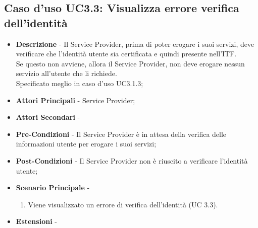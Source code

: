 \subsection{Caso d'uso UC3.3: Visualizza errore verifica dell'identità}
\begin{itemize}
	\item \textbf{Descrizione} - Il Service Provider, prima di poter erogare i suoi servizi, deve verificare che l'identità utente sia certificata e quindi presente nell'\gls{ITF}.\\
	Se questo non avviene, allora il Service Provider, non deve erogare nessun servizio all'utente che li richiede.\\
	Specificato meglio in caso d'uso UC3.1.3;
	\item \textbf{Attori Principali} - Service Provider;
	\item \textbf{Attori Secondari} -
	\item \textbf{Pre-Condizioni} - Il Service Provider è in attesa della verifica delle informazioni utente per erogare i suoi servizi;
	\item \textbf{Post-Condizioni} - Il Service Provider non è riuscito a verificare l'identità utente;
	\item \textbf{Scenario Principale} -
	\begin{enumerate}
		\item Viene visualizzato un errore di verifica dell'identità (UC 3.3).
	\end{enumerate}
	\item \textbf{Estensioni} -
\end{itemize}
